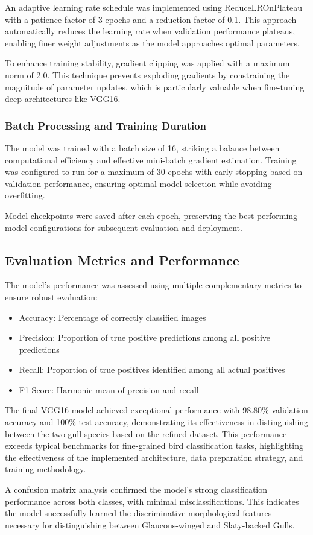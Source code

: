 An adaptive learning rate schedule was implemented using ReduceLROnPlateau with a patience factor of 3 epochs and a reduction factor of 0.1. This approach automatically reduces the learning rate when validation performance plateaus, enabling finer weight adjustments as the model approaches optimal parameters.

To enhance training stability, gradient clipping was applied with a maximum norm of 2.0. This technique prevents exploding gradients by constraining the magnitude of parameter updates, which is particularly valuable when fine-tuning deep architectures like VGG16.

\subsubsection{Batch Processing and Training Duration}

The model was trained with a batch size of 16, striking a balance between computational efficiency and effective mini-batch gradient estimation. Training was configured to run for a maximum of 30 epochs with early stopping based on validation performance, ensuring optimal model selection while avoiding overfitting.

Model checkpoints were saved after each epoch, preserving the best-performing model configurations for subsequent evaluation and deployment.

\subsection{Evaluation Metrics and Performance}

The model's performance was assessed using multiple complementary metrics to ensure robust evaluation:
\begin{itemize}
    \item Accuracy: Percentage of correctly classified images
    \item Precision: Proportion of true positive predictions among all positive predictions
    \item Recall: Proportion of true positives identified among all actual positives
    \item F1-Score: Harmonic mean of precision and recall
\end{itemize}

The final VGG16 model achieved exceptional performance with 98.80\% validation accuracy and 100\% test accuracy, demonstrating its effectiveness in distinguishing between the two gull species based on the refined dataset. This performance exceeds typical benchmarks for fine-grained bird classification tasks, highlighting the effectiveness of the implemented architecture, data preparation strategy, and training methodology.

A confusion matrix analysis confirmed the model's strong classification performance across both classes, with minimal misclassifications. This indicates the model successfully learned the discriminative morphological features necessary for distinguishing between Glaucous-winged and Slaty-backed Gulls.


